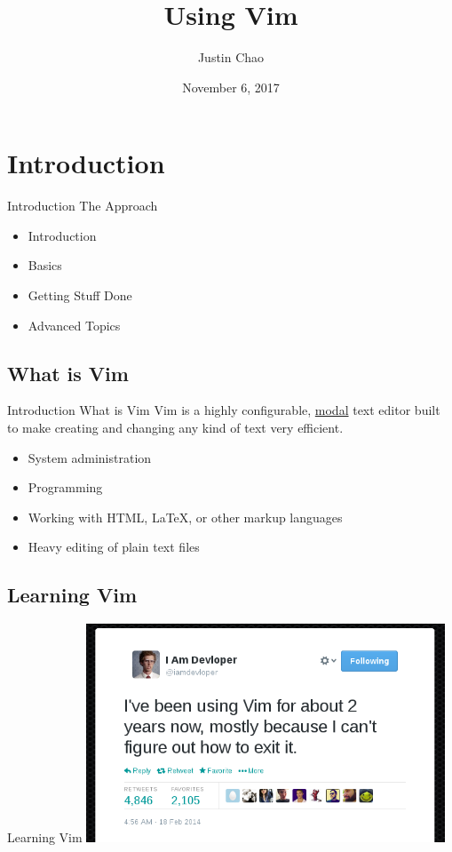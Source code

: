 \documentclass{beamer}
\title{Using Vim}
\author{Justin Chao}
\date{November 6, 2017}
\begin{document}
\frame{\titlepage}

\section{Introduction}

\begin{frame} {Introduction} {The Approach}
    \begin{itemize}
        \item Introduction \\ 
        \item Basics \\
        \item Getting Stuff Done \\
        \item Advanced Topics
    \end{itemize}
\end{frame}

\subsection{What is Vim}
\begin{frame} {Introduction} {What is Vim}
    Vim is a highly configurable, \underline{modal} text editor built to make creating and changing any kind of text
    very efficient. \\

    \begin{itemize}
        \item System administration\\
        \item Programming\\
        \item Working with HTML, LaTeX, or other markup languages\\
        \item Heavy editing of plain text files\\
    \end{itemize}
\end{frame}

\subsection{Learning Vim}
\begin{frame}[t]{Learning Vim}
    \centering
    \includegraphics[width=0.8\textwidth]{learningVim}
\end{frame}
\end{document}
